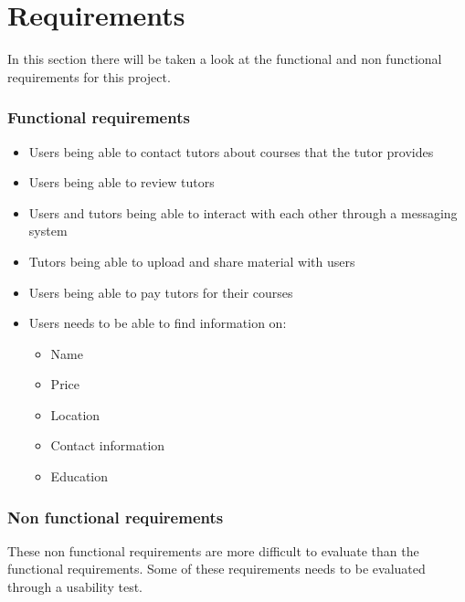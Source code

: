 \section{Requirements}
In this section there will be taken a look at the functional and non functional requirements for this project.


\subsubsection{Functional requirements}
\begin{itemize}
    \item Users being able to contact tutors about courses that the tutor provides
    \item Users being able to review tutors
    \item Users and tutors being able to interact with each other through a messaging system
    \item Tutors being able to upload and share material with users
    \item Users being able to pay tutors for their courses
    \item Users needs to be able to find information on:
    \begin{itemize}
        \item Name
        \item Price
        \item Location
        \item Contact information
        \item Education
    \end{itemize}
\end{itemize}

\subsubsection{Non functional requirements}
These non functional requirements are more difficult to evaluate than the functional requirements.
Some of these requirements needs to be evaluated through a usability test. 

